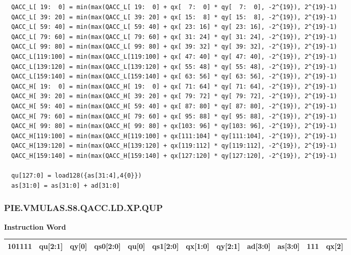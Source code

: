 \begin{lstlisting}
  QACC_L[ 19:  0] = min(max(QACC_L[ 19:  0] + qx[  7:  0] * qy[  7:  0], -2^{19}), 2^{19}-1)
  QACC_L[ 39: 20] = min(max(QACC_L[ 39: 20] + qx[ 15:  8] * qy[ 15:  8], -2^{19}), 2^{19}-1)
  QACC_L[ 59: 40] = min(max(QACC_L[ 59: 40] + qx[ 23: 16] * qy[ 23: 16], -2^{19}), 2^{19}-1)
  QACC_L[ 79: 60] = min(max(QACC_L[ 79: 60] + qx[ 31: 24] * qy[ 31: 24], -2^{19}), 2^{19}-1)
  QACC_L[ 99: 80] = min(max(QACC_L[ 99: 80] + qx[ 39: 32] * qy[ 39: 32], -2^{19}), 2^{19}-1)
  QACC_L[119:100] = min(max(QACC_L[119:100] + qx[ 47: 40] * qy[ 47: 40], -2^{19}), 2^{19}-1)
  QACC_L[139:120] = min(max(QACC_L[139:120] + qx[ 55: 48] * qy[ 55: 48], -2^{19}), 2^{19}-1)
  QACC_L[159:140] = min(max(QACC_L[159:140] + qx[ 63: 56] * qy[ 63: 56], -2^{19}), 2^{19}-1)
  QACC_H[ 19:  0] = min(max(QACC_H[ 19:  0] + qx[ 71: 64] * qy[ 71: 64], -2^{19}), 2^{19}-1)
  QACC_H[ 39: 20] = min(max(QACC_H[ 39: 20] + qx[ 79: 72] * qy[ 79: 72], -2^{19}), 2^{19}-1)
  QACC_H[ 59: 40] = min(max(QACC_H[ 59: 40] + qx[ 87: 80] * qy[ 87: 80], -2^{19}), 2^{19}-1)
  QACC_H[ 79: 60] = min(max(QACC_H[ 79: 60] + qx[ 95: 88] * qy[ 95: 88], -2^{19}), 2^{19}-1)
  QACC_H[ 99: 80] = min(max(QACC_H[ 99: 80] + qx[103: 96] * qy[103: 96], -2^{19}), 2^{19}-1)
  QACC_H[119:100] = min(max(QACC_H[119:100] + qx[111:104] * qy[111:104], -2^{19}), 2^{19}-1)
  QACC_H[139:120] = min(max(QACC_H[139:120] + qx[119:112] * qy[119:112], -2^{19}), 2^{19}-1)
  QACC_H[159:140] = min(max(QACC_H[159:140] + qx[127:120] * qy[127:120], -2^{19}), 2^{19}-1)

  qu[127:0] = load128({as[31:4],4{0}})
  as[31:0] = as[31:0] + ad[31:0]
\end{lstlisting}

\newpage
\subsubsection{PIE.VMULAS.S8.QACC.LD.XP.QUP}\label{instruction:PIEVMULASS8QACCLDXPQUP}
\setlength\tabcolsep{6pt}
\textbf{Instruction Word} \\
\begin{tabular}{|c|c|c|c|c|c|c|c|c|c|c|c|}
	\hline
	101111 & qu[2:1] & qy[0] & qs0[2:0] & qu[0] & qs1[2:0] & qx[1:0] & qy[2:1] & ad[3:0] & as[3:0] & 111 & qx[2] \\
	\hline
\end{tabular}

